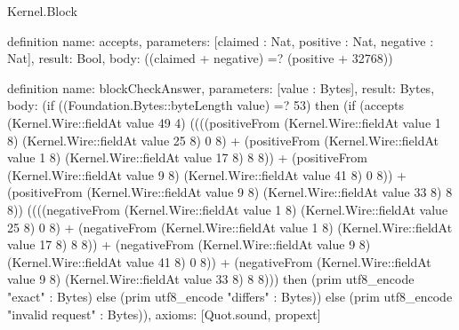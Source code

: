 \begin{lexlean}{Kernel.Block}
\begin{semanticmodule}
definition{
  name: accepts,
  parameters: [claimed : Nat, positive : Nat, negative : Nat],
  result: Bool,
  body: ((claimed + negative) =? (positive + 32768))
}

definition{
  name: blockCheckAnswer,
  parameters: [value : Bytes],
  result: Bytes,
  body: (if ((Foundation.Bytes::byteLength value) =? 53) then (if (accepts (Kernel.Wire::fieldAt value 49 4) ((((positiveFrom (Kernel.Wire::fieldAt value 1 8) (Kernel.Wire::fieldAt value 25 8) 0 8) + (positiveFrom (Kernel.Wire::fieldAt value 1 8) (Kernel.Wire::fieldAt value 17 8) 8 8)) + (positiveFrom (Kernel.Wire::fieldAt value 9 8) (Kernel.Wire::fieldAt value 41 8) 0 8)) + (positiveFrom (Kernel.Wire::fieldAt value 9 8) (Kernel.Wire::fieldAt value 33 8) 8 8)) ((((negativeFrom (Kernel.Wire::fieldAt value 1 8) (Kernel.Wire::fieldAt value 25 8) 0 8) + (negativeFrom (Kernel.Wire::fieldAt value 1 8) (Kernel.Wire::fieldAt value 17 8) 8 8)) + (negativeFrom (Kernel.Wire::fieldAt value 9 8) (Kernel.Wire::fieldAt value 41 8) 0 8)) + (negativeFrom (Kernel.Wire::fieldAt value 9 8) (Kernel.Wire::fieldAt value 33 8) 8 8))) then (prim utf8_encode "exact" : Bytes) else (prim utf8_encode "differs" : Bytes)) else (prim utf8_encode "invalid request" : Bytes)),
  axioms: [Quot.sound, propext]
}
\end{semanticmodule}
\end{lexlean}
